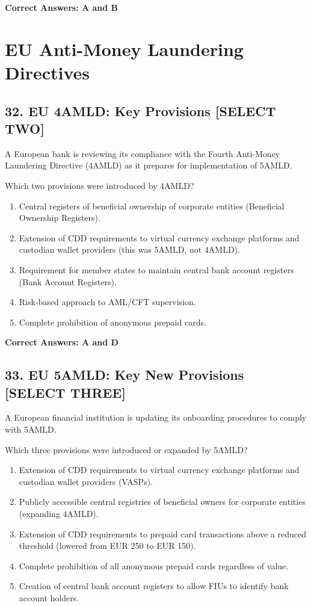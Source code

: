 \documentclass[11pt,a4paper]{article}
\begin{document}
	\textbf{Correct Answers: A and B}
	
	\section{EU Anti-Money Laundering Directives}
	
	\subsection{32. EU 4AMLD: Key Provisions \textnormal{[SELECT TWO]}}
	
	A European bank is reviewing its compliance with the Fourth Anti-Money Laundering Directive (4AMLD) as it prepares for implementation of 5AMLD.
	
	Which two provisions were introduced by 4AMLD?
	
	\begin{enumerate}[label=\Alph*.]
		\item Central registers of beneficial ownership of corporate entities (Beneficial Ownership Registers).
		\item Extension of CDD requirements to virtual currency exchange platforms and custodian wallet providers (this was 5AMLD, not 4AMLD).
		\item Requirement for member states to maintain central bank account registers (Bank Account Registers).
		\item Risk-based approach to AML/CFT supervision.
		\item Complete prohibition of anonymous prepaid cards.
	\end{enumerate}
	
	\textbf{Correct Answers: A and D}
	
	\subsection{33. EU 5AMLD: Key New Provisions \textnormal{[SELECT THREE]}}
	
	A European financial institution is updating its onboarding procedures to comply with 5AMLD.
	
	Which three provisions were introduced or expanded by 5AMLD?
	
	\begin{enumerate}[label=\Alph*.]
		\item Extension of CDD requirements to virtual currency exchange platforms and custodian wallet providers (VASPs).
		\item Publicly accessible central registries of beneficial owners for corporate entities (expanding 4AMLD).
		\item Extension of CDD requirements to prepaid card transactions above a reduced threshold (lowered from EUR 250 to EUR 150).
		\item Complete prohibition of all anonymous prepaid cards regardless of value.
		\item Creation of central bank account registers to allow FIUs to identify bank account holders.
	\end{enumerate}
	
\end{document}
